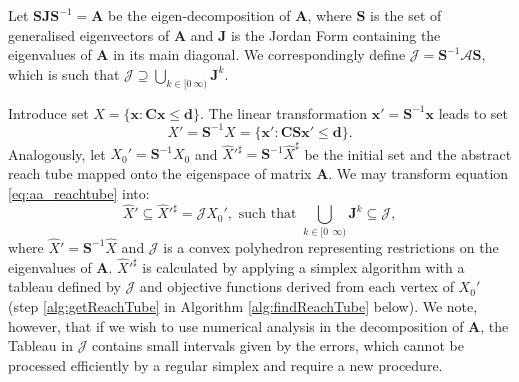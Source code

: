\documentclass[twocolumn]{autart}    %
\newcommand{\mat}[1]{\boldsymbol{#1}}
\renewcommand{\vec}[1]{\boldsymbol{#1}}
\begin{document}
Let $\mat{S}\mat{J}\mat{S}^{-1}=\mat{A}$ be the eigen-decomposition of
$\mat{A}$, where $\mat{S}$ is the set of generalised eigenvectors of
$\mat{A}$ and $\mat{J}$ is the Jordan Form containing the eigenvalues of
$\mat{A}$ in its main diagonal.  We correspondingly define
$\mathcal{J}=\mat{S}^{-1}\mathcal{A}\mat{S}$, which is such that
$\mathcal{J} \supseteq \bigcup_{k \in [0\ \infty)} \mat{J}^k$.

Introduce set $X=\{ \vec{x} : \mat{C}\vec{x} \leq \vec{d}\}$. 
The linear transformation $\vec{x}'=\mat{S}^{-1}\vec{x}$ leads to set 
%
\begin{equation}
X'= \mat{S}^{-1}X = \{\vec{x}' : \mat{C}\mat{S}\vec{x}'\leq \vec{d}\}.  
\label{eq:eigenInit}
\end{equation}
%
Analogously, let $X_0'=\mat{S}^{-1}X_0$ and
${\hat{X}'^\sharp}=\mat{S}^{-1}{\hat{X}^\sharp}$ be the initial set and the
abstract reach tube mapped onto the eigenspace of matrix $\mat{A}$.  We may
transform equation \eqref{eq:aa_reachtube} into:
%
\begin{equation}
\hat{X}' \subseteq {\hat{X}'^\sharp} = \mathcal{J}X_0', \text{ such that } \bigcup_{k \in [0\ \ \infty)}\mat{J}^k \subseteq \mathcal{J}, 
\end{equation}
%
where $\hat{X}'=\mat{S}^{-1}\hat{X}$ and $\mathcal{J}$ is a convex
polyhedron representing restrictions on the eigenvalues of $\mat{A}$. 
$\hat{X}'^\sharp$ is calculated by applying a simplex algorithm with a
tableau defined by $\mathcal{J}$ and objective functions derived from each
vertex of $X_0'$ (step \eqref{alg:getReachTube} in Algorithm
\ref{alg:findReachTube} below).  We note, however, that if we wish to use
numerical analysis in the decomposition of $\mat{A}$, the Tableau in
$\mathcal{J}$ contains small intervals given by the errors, which cannot be
processed efficiently by a regular simplex and require a new procedure.
\end{document}

